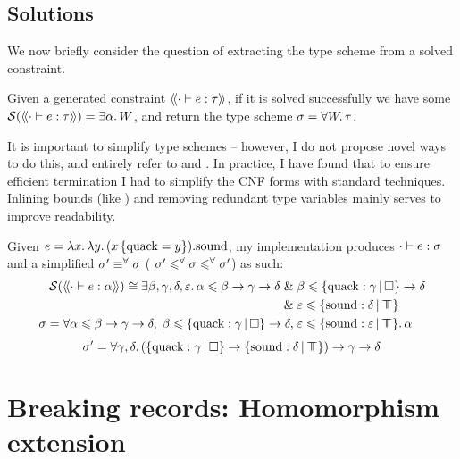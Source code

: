 \subsection{Solutions}
\label{subsec:simplification}

We now briefly consider the question of extracting the type scheme from a solved constraint. 

Given a generated constraint $\cstr{\cdot}{e}{\tau}$, if it is solved successfully we have some $\mathcal S \left( \cstr{\cdot}{e}{\tau} \right) = \exists \overline{\alpha} \ldotp \sbnd$, and return the type scheme $\sigma =  \forall W \ldotp \tau$.

It is important to simplify type schemes -- however, I do not propose novel ways to do this, and entirely refer to \textcite{simple-sub} and \textcite{mlstruct}. In practice, I have found that to ensure efficient termination I had to simplify the CNF forms with standard techniques. Inlining bounds (like \textcite{dolan-thesis}) and removing redundant type variables mainly serves to improve readability.

\begin{example}
    Given
    $e = \lambda {x} \ldotp \lambda {y} \ldotp {(x \, \{ \mathrm{quack} = y \})}{.}{\mathrm{sound}}$,
    my implementation produces $\cdot \vdash e : \sigma$ and a simplified $\sigma' \equiv^\forall \sigma$ (\ie{} $\sigma' \leqslant^\forall \sigma \leqslant^\forall \sigma'$) as such:
    \begin{align*}
    \mathcal S(\cstr{\cdot}{e}{\alpha}) \cong \exists \beta, \gamma, \delta, \varepsilon \ldotp \alpha \sub \beta \to \gamma \to \delta \und& \beta \sub \flext{\mathrm{quack}: \gamma}{\flabsent} \to \delta \\ \und& \varepsilon \sub \flext{\mathrm{sound}: \delta}{\flftop} \\
    \sch = \forall \alpha \sub \beta \to \gamma \to \delta,\; \beta \sub \flext{\mathrm{quack}: \gamma}{\flabsent} \to \delta,\;& \varepsilon \sub \flext{\mathrm{sound}: \varepsilon}{\flftop} \ldotp \alpha
    \end{align*}    
    $$ \sch' = \forall \gamma, \delta \ldotp (\flext{\mathrm{quack}: \gamma}{\flabsent} \to \flext{\mathrm{sound} : \delta}{\flftop}) \to \gamma \to \delta $$
\end{example}

\section{Breaking records: Homomorphism extension}
\label{sec:morphisms}

